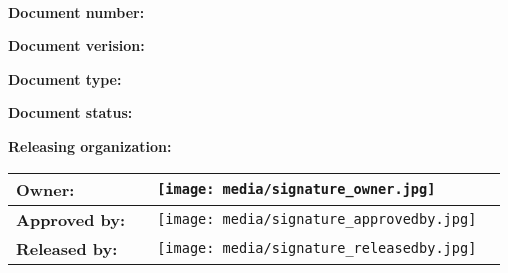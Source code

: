 \begin{center}
  \begin{tcolorbox}[colframe=andesbrown, colback=andesgray, width=\textwidth]
    \

    \begin{center}
      {\bf \Large \bigskip \textcolor{andesbrown} \ESOdoctitle{} }
    \end{center}

    \bigskip

    \bigskip

    {\bf Document number:} \ESOdocnumber{}

    \medskip

    {\bf Document verision:} \ESOdocversion{}

    \smallskip

    {\bf Document type:} \ESOdoctype{}

    \smallskip

    {\bf Document status:} \ESOdocstatus{}

    \smallskip

    {\bf Releasing organization:} \ESOdocorganization{}

    \bigskip

  \end{tcolorbox}
\end{center}

\vfill

\begin{center}
  \renewcommand{\arraystretch}{2.5}
  \begin{tabularx}{\textwidth}{|l|X|l|c|}
    \hline
    {\bf \small Owner:}       &  \ESOowner{}             & \parbox[c]{0.28\textwidth}{\texttt{[image: media/signature\_owner.jpg]}}      & \ESOownerdate{}      \\ \hline
    {\bf \small Approved by:} &  \ESOapprovedby{}        & \parbox[c]{0.28\textwidth}{\texttt{[image: media/signature\_approvedby.jpg]}} & \ESOapprovedbydate{} \\ \hline
    {\bf \small Released by:} &  \ESOreleasedby{}        & \parbox[c]{0.28\textwidth}{\texttt{[image: media/signature\_releasedby.jpg]}} & \ESOreleasedbydate{} \\ \hline
  \end{tabularx}
  \renewcommand{\arraystretch}{1}
\end{center}


\restoregeometry

